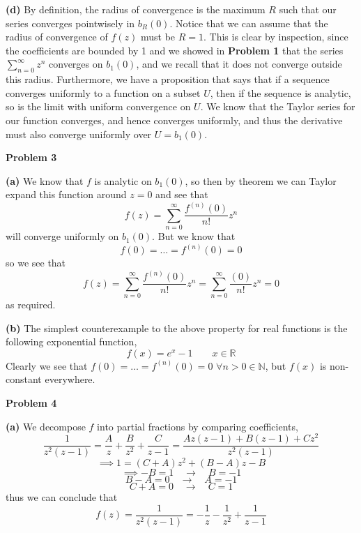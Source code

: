\documentclass[10pt]{article}
\newcommand{\R}{\mathbb{R}}
\begin{document}
\textbf{(d)}
By definition, the radius of convergence is the maximum $R$ such that our series converges pointwisely in $b_{R}(0)$. Notice that we can assume that the radius of convergence of $f(z)$ must be $R=1$. This is clear by inspection, since the coefficients are bounded by 1 and we showed in \textbf{Problem 1} that the series $\sum_{n=0}^{\infty}z^{n}$ converges on $b_{1}(0)$, and we recall that it does not converge outside this radius. Furthermore, we have a proposition that says that if a sequence converges uniformly to a function on a subset $U$, then if the sequence is analytic, so is the limit with uniform convergence on $U$. We know that the Taylor series for our function converges, and hence converges uniformly, and thus the derivative must also converge uniformly over $U = b_{1}(0)$.


\textbf{Problem 3}

\textbf{(a)}
We know that $f$ is analytic on $b_{1}(0)$, so then by theorem we can Taylor expand this function around $z=0$ and see that
$$f(z) = \sum_{n=0}^{\infty}\frac{f^{(n)}(0)}{n!}z^{n}$$
will converge uniformly on $b_{1}(0)$. But we know that
$$f(0) = \dots = f^{(n)}(0) = 0$$
so we see that
$$f(z) = \sum_{n=0}^{\infty}\frac{f^{(n)}(0)}{n!}z^{n} = \sum_{n=0}^{\infty}\frac{(0)}{n!}z^{n} = 0$$
as required.

\textbf{(b)}
The simplest counterexample to the above property for real functions is the following exponential function,
$$f(x) = e^{x} - 1 \hspace{2em} x \in \R$$
Clearly we see that $f(0) = \dots = f^{(n)}(0) = 0$ $\forall n > 0 \in \mathbb{N}$, but $f(x)$ is non-constant everywhere.

\textbf{Problem 4}

\textbf{(a)}
We decompose $f$ into partial fractions by comparing coefficients,
$$\frac{1}{z^{2}(z-1)} = \frac{A}{z} + \frac{B}{z^{2}} + \frac{C}{z-1} = \frac{Az(z-1) + B(z-1) + Cz^{2}}{z^{2}(z-1)}$$
$$\implies 1 = (C + A)z^{2} + (B-A)z - B$$
$$\implies -B = 1 \hspace{1em} \to \hspace{1em} B = -1$$
$$B - A = 0 \hspace{1em} \to \hspace{1em} A = -1$$
$$C+A = 0 \hspace{1em} \to \hspace{1em} C = 1$$
thus we can conclude that
$$f(z) = \frac{1}{z^{2}(z-1)} = -\frac{1}{z} - \frac{1}{z^{2}} + \frac{1}{z-1}$$
\end{document}
